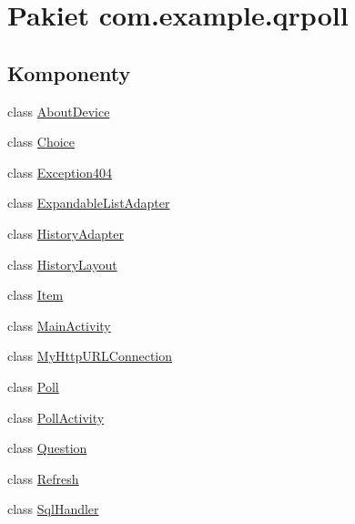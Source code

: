\hypertarget{namespacecom_1_1example_1_1qrpoll}{\section{Pakiet com.\+example.\+qrpoll}
\label{namespacecom_1_1example_1_1qrpoll}
}
\subsection*{Komponenty}
\begin{DoxyCompactItemize}
\item 
class \hyperlink{classcom_1_1example_1_1qrpoll_1_1_about_device}{About\+Device}
\item 
class \hyperlink{classcom_1_1example_1_1qrpoll_1_1_choice}{Choice}
\item 
class \hyperlink{classcom_1_1example_1_1qrpoll_1_1_exception404}{Exception404}
\item 
class \hyperlink{classcom_1_1example_1_1qrpoll_1_1_expandable_list_adapter}{Expandable\+List\+Adapter}
\item 
class \hyperlink{classcom_1_1example_1_1qrpoll_1_1_history_adapter}{History\+Adapter}
\item 
class \hyperlink{classcom_1_1example_1_1qrpoll_1_1_history_layout}{History\+Layout}
\item 
class \hyperlink{classcom_1_1example_1_1qrpoll_1_1_item}{Item}
\item 
class \hyperlink{classcom_1_1example_1_1qrpoll_1_1_main_activity}{Main\+Activity}
\item 
class \hyperlink{classcom_1_1example_1_1qrpoll_1_1_my_http_u_r_l_connection}{My\+Http\+U\+R\+L\+Connection}
\item 
class \hyperlink{classcom_1_1example_1_1qrpoll_1_1_poll}{Poll}
\item 
class \hyperlink{classcom_1_1example_1_1qrpoll_1_1_poll_activity}{Poll\+Activity}
\item 
class \hyperlink{classcom_1_1example_1_1qrpoll_1_1_question}{Question}
\item 
class \hyperlink{classcom_1_1example_1_1qrpoll_1_1_refresh}{Refresh}
\item 
class \hyperlink{classcom_1_1example_1_1qrpoll_1_1_sql_handler}{Sql\+Handler}
\end{DoxyCompactItemize}
